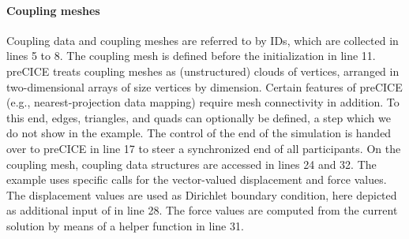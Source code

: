 \paragraph{Coupling meshes} Coupling data and coupling meshes are referred to by IDs, which are collected in lines 5 to 8.
The coupling mesh is defined before the initialization in line 11. preCICE treats coupling meshes as (unstructured) clouds of vertices, arranged in two-dimensional arrays of size vertices by dimension. Certain features of preCICE (e.g., nearest-projection data mapping) require mesh connectivity in addition. To this end, edges, triangles, and quads can optionally be defined, a step which we do not show in the example. 
The control of the end of the simulation is handed over to preCICE in line 17 to steer a synchronized end of all participants.
On the coupling mesh, coupling data structures are accessed in lines 24 and 32. The example uses specific calls for the vector-valued displacement and force values. The displacement values are used as Dirichlet boundary condition, here depicted as additional input of  in line 28. The force values are computed from the current solution by means of a helper function in line 31. 









        

